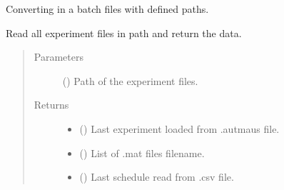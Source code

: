 \documentclass[letterpaper,10pt,english]{sphinxmanual}
\begin{document}

\begin{fulllineitems}
\label{\detokenize{NoSeMazeController/Analysis:Analysis.Conversion.convert}}
\pysigstartsignatures
{}
\pysigstopsignatures
\sphinxAtStartPar
Converting in a batch files with defined paths.

\end{fulllineitems}


\begin{fulllineitems}
\label{\detokenize{NoSeMazeController/Analysis:Analysis.Conversion.load_experiment}}
\pysigstartsignatures
{}
\pysigstopsignatures
\sphinxAtStartPar
Read all experiment files in path and return the data.
\begin{quote}\begin{description}
\item[{Parameters}] \leavevmode
\sphinxAtStartPar
{} () \textendash{} Path of the experiment files.

\item[{Returns}] \leavevmode
\sphinxAtStartPar
\begin{itemize}
\item {} 
\sphinxAtStartPar
{} () \textendash{} Last experiment loaded from .autmaus file.

\item {} 
\sphinxAtStartPar
{} () \textendash{} List of .mat files filename.

\item {} 
\sphinxAtStartPar
{} () \textendash{} Last schedule read from .csv file.

\end{itemize}


\end{description}\end{quote}

\end{fulllineitems}
\end{document}
